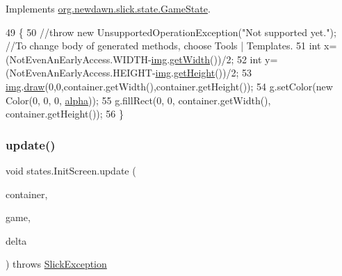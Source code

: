 Implements \mbox{\hyperlink{interfaceorg_1_1newdawn_1_1slick_1_1state_1_1_game_state_a065352d2725274c5244cd022f226eb17}{org.\+newdawn.\+slick.\+state.\+Game\+State}}.


\begin{DoxyCode}
49                                                                                                        \{
50         \textcolor{comment}{//throw new UnsupportedOperationException("Not supported yet."); //To change body of generated
       methods, choose Tools | Templates.}
51         \textcolor{keywordtype}{int} x=(NotEvenAnEarlyAccess.WIDTH-\mbox{\hyperlink{classstates_1_1_init_screen_a93fd19d9569e5b004ea177a3d8510777}{img}}.\mbox{\hyperlink{classorg_1_1newdawn_1_1slick_1_1_image_a94a5d32276e8a27930480223c5d69e11}{getWidth}}())/2;
52         \textcolor{keywordtype}{int} y=(NotEvenAnEarlyAccess.HEIGHT-\mbox{\hyperlink{classstates_1_1_init_screen_a93fd19d9569e5b004ea177a3d8510777}{img}}.\mbox{\hyperlink{classorg_1_1newdawn_1_1slick_1_1_image_aa2594a93f5126f60ad8a72444fceee98}{getHeight}}())/2;
53         \mbox{\hyperlink{classstates_1_1_init_screen_a93fd19d9569e5b004ea177a3d8510777}{img}}.\mbox{\hyperlink{classorg_1_1newdawn_1_1slick_1_1_image_a9bddcca05c7140ab45df8ac5b250b6cd}{draw}}(0,0,container.getWidth(),container.getHeight());
54         g.setColor(\textcolor{keyword}{new} Color(0, 0, 0, \mbox{\hyperlink{classstates_1_1_init_screen_a00c24ac1441b1b92a8bdd02d539cb68e}{alpha}}));
55         g.fillRect(0, 0, container.getWidth(), container.getHeight());
56     \}
\end{DoxyCode}
\mbox{\label{classstates_1_1_init_screen_a1da0633b981bad92a90d5f72e56561bd}} 
\subsubsection{\texorpdfstring{update()}{update()}}
{\footnotesize\ttfamily void states.\+Init\+Screen.\+update (\begin{DoxyParamCaption}\item[{\mbox{\hyperlink{classorg_1_1newdawn_1_1slick_1_1_game_container}{Game\+Container}}}]{container,  }\item[{\mbox{\hyperlink{classorg_1_1newdawn_1_1slick_1_1state_1_1_state_based_game}{State\+Based\+Game}}}]{game,  }\item[{int}]{delta }\end{DoxyParamCaption}) throws \mbox{\hyperlink{classorg_1_1newdawn_1_1slick_1_1_slick_exception}{Slick\+Exception}}\hspace{0.3cm}{\ttfamily [inline]}}

